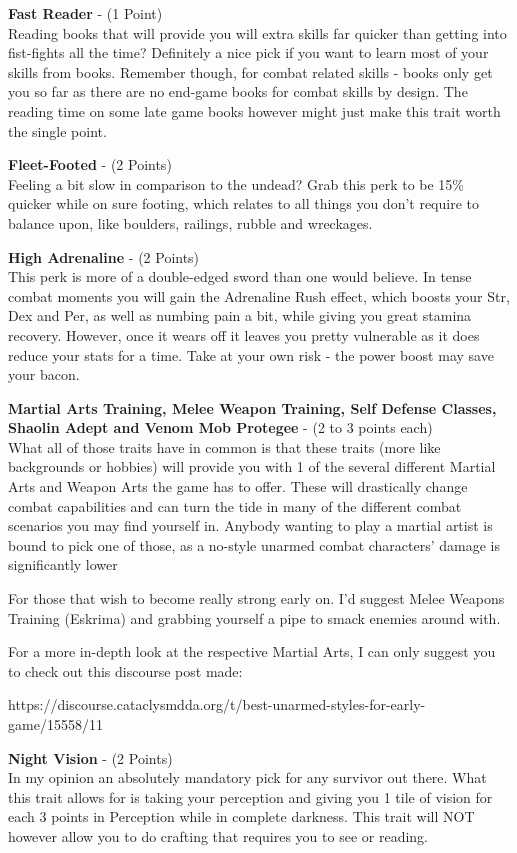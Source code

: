\textbf{Fast Reader} - (1 Point)\\Reading books that will provide you will extra skills far quicker than getting into fist-fights all the time? Definitely a nice pick if you want to learn most of your skills from books. Remember though, for combat related skills - books only get you so far as there are no end-game books for combat skills by design. The reading time on some late game books however might just make this trait worth the single point.

\textbf{Fleet-Footed} - (2 Points)\\Feeling a bit slow in comparison to the undead? Grab this perk to be 15\% quicker while on sure footing, which relates to all things you don't require to balance upon, like boulders, railings, rubble and wreckages.

\textbf{High Adrenaline} - (2 Points)\\This perk is more of a double-edged sword than one would believe. In tense combat moments you will gain the Adrenaline Rush effect, which boosts your Str, Dex and Per, as well as numbing pain a bit, while giving you great stamina recovery. However, once it wears off it leaves you pretty vulnerable as it does reduce your stats for a time. Take at your own risk - the power boost may save your bacon.

\textbf{Martial Arts Training, Melee Weapon Training, Self Defense Classes, Shaolin Adept and Venom Mob Protegee} - (2 to 3 points each)\\What all of those traits have in common is that these traits (more like backgrounds or hobbies) will provide you with 1 of the several different Martial Arts and Weapon Arts the game has to offer. These will drastically change combat capabilities and can turn the tide in many of the different combat scenarios you may find yourself in. Anybody wanting to play a martial artist is bound to pick one of those, as a no-style unarmed combat characters' damage is significantly lower

For those that wish to become really strong early on. I'd suggest Melee Weapons Training (Eskrima) and grabbing yourself a pipe to smack enemies around with.

For a more in-depth look at the respective Martial Arts, I can only suggest you to check out this discourse post made:

https://discourse.cataclysmdda.org/t/best-unarmed-styles-for-early-game/15558/11

\textbf{Night Vision} - (2 Points)\\In my opinion an absolutely mandatory pick for any survivor out there. What this trait allows for is taking your perception and giving you 1 tile of vision for each 3 points in Perception while in complete darkness. This trait will NOT however allow you to do crafting that requires you to see or reading.

